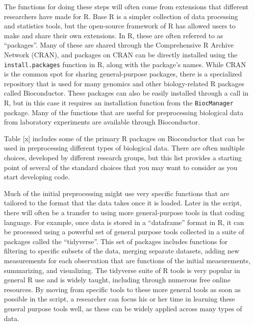 \documentclass[]{tufte-book}
\begin{document}
The functions for doing these steps will often come from extensions that
different researchers have made for R. Base R is a simpler collection of data
processing and statistics tools, but the open-source framework of R has allowed
users to make and share their own extensions. In R, these are often referred to
as ``packages''. Many of these are shared through the Comprehensive R Archive
Network (CRAN), and packages on CRAN can be directly installed using the
\texttt{install.packages} function in R, along with the package's names. While CRAN
is the common spot for sharing general-purpose packages, there is a specialized
repository that is used for many genomics and other biology-related R packages
called Bioconductor. These packages can also be easily installed through a call
in R, but in this case it requires an installation function from the \texttt{BiocManager}
package. Many of the functions that are useful for preprocessing biological
data from laboratory experiments are available through Bioconductor.

Table {[}x{]} includes some of the primary R packages on Bioconductor that can be
used in preprocessing different types of biological data. There are often
multiple choices, developed by different research groups, but this list provides
a starting point of several of the standard choices that you may want to
consider as you start developing code.

Much of the initial preprocessing might use very specific functions that are
tailored to the format that the data takes once it is loaded. Later in the
script, there will often be a transfer to using more general-purpose tools in
that coding language. For example, once data is stored in a ``dataframe'' format
in R, it can be processed using a powerful set of general purpose tools
collected in a suite of packages called the ``tidyverse''. This set of packages
includes functions for filtering to specific subsets of the data, merging
separate datasets, adding new measurements for each observation that are
functions of the initial measurements, summarizing, and visualizing. The
tidyverse suite of R tools is very popular in general R use and is widely
taught, including through numerous free online resources. By moving from
specific tools to these more general tools as soon as possible in the script, a
researcher can focus his or her time in learning these general purpose tools
well, as these can be widely applied across many types of data.
\end{document}
